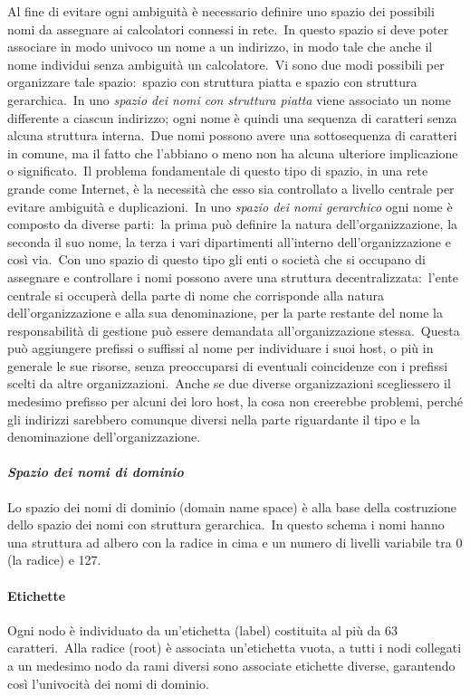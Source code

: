 Al fine di evitare ogni ambiguità è necessario definire uno spazio dei possibili nomi da assegnare ai calcolatori connessi in rete.\
In questo spazio si deve poter associare in modo univoco un nome a un indirizzo, in modo tale che anche il nome individui senza ambiguità un calcolatore.\
Vi sono due modi possibili per organizzare tale spazio:\ spazio con struttura piatta e spazio con struttura gerarchica.\
In uno \emph{spazio dei nomi con struttura piatta} viene associato un nome differente a ciascun indirizzo; ogni nome è quindi una sequenza di caratteri senza alcuna struttura interna.\
Due nomi possono avere una sottosequenza di caratteri in comune, ma il fatto che l'abbiano o meno non ha alcuna ulteriore implicazione o significato.\
Il problema fondamentale di questo tipo di spazio, in una rete grande come Internet, è la necessità che esso sia controllato a livello centrale per evitare ambiguità e duplicazioni.\
In uno \emph{spazio dei nomi gerarchico} ogni nome è composto da diverse parti:\ la prima può definire la natura dell'organizzazione, la seconda il suo nome, la terza i vari dipartimenti all'interno dell'organizzazione e così via.\
Con uno spazio di questo tipo gli enti o società che si occupano di assegnare e controllare i nomi possono avere una struttura decentralizzata:\ l'ente centrale si occuperà della parte di nome che corrisponde alla natura dell'organizzazione e alla sua denominazione, per la parte restante del nome la responsabilità di gestione può essere demandata all'organizzazione stessa.\
Questa può aggiungere prefissi o suffissi al nome per individuare i suoi host, o più in generale le sue risorse, senza preoccuparsi di eventuali coincidenze con i prefissi scelti da altre organizzazioni.\
Anche se due diverse organizzazioni scegliessero il medesimo prefisso per alcuni dei loro host, la cosa non creerebbe problemi, perché gli indirizzi sarebbero comunque diversi nella parte riguardante il tipo e la denominazione dell'organizzazione.

\paragraph{\emph{Spazio dei nomi di dominio}} Lo spazio dei nomi di dominio (domain name space) è alla base della costruzione dello spazio dei nomi con struttura gerarchica.\
In questo schema i nomi hanno una struttura ad albero con la radice in cima e un numero di livelli variabile tra 0 (la radice) e 127.

\paragraph{Etichette} Ogni nodo è individuato da un'etichetta (label) costituita al più da 63 caratteri.\
Alla radice (root) è associata un'etichetta vuota, a tutti i nodi collegati a un medesimo nodo da rami diversi sono associate etichette diverse, garantendo così l'univocità dei nomi di dominio.

